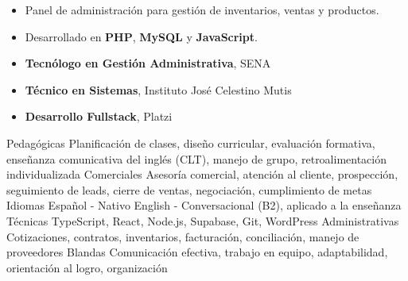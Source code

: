 \documentclass[11pt, a4paper]{awesome-cv}
\begin{document}
\divider

\begin{itemize}
  \item Panel de administración para gestión de inventarios, ventas y productos.
  \item Desarrollado en \textbf{PHP}, \textbf{MySQL} y \textbf{JavaScript}.
\end{itemize}


\begin{itemize}
  \item \textbf{Tecnólogo en Gestión Administrativa}, SENA
  \item \textbf{Técnico en Sistemas}, Instituto José Celestino Mutis
  \item \textbf{Desarrollo Fullstack}, Platzi
\end{itemize}


\begin{cvskills}
  \cvskill
    {Pedagógicas}
    {Planificación de clases, diseño curricular, evaluación formativa, enseñanza comunicativa del inglés (CLT), manejo de grupo, retroalimentación individualizada}
  \cvskill
    {Comerciales}
    {Asesoría comercial, atención al cliente, prospección, seguimiento de leads, cierre de ventas, negociación, cumplimiento de metas}
  \cvskill
    {Idiomas}
    {Español - Nativo \quad English - Conversacional (B2), aplicado a la enseñanza}
  \cvskill
    {Técnicas}
    {TypeScript, React, Node.js, Supabase, Git, WordPress}
  \cvskill
    {Administrativas}
    {Cotizaciones, contratos, inventarios, facturación, conciliación, manejo de proveedores}
  \cvskill
    {Blandas}
    {Comunicación efectiva, trabajo en equipo, adaptabilidad, orientación al logro, organización}
\end{cvskills}

\end{document}
